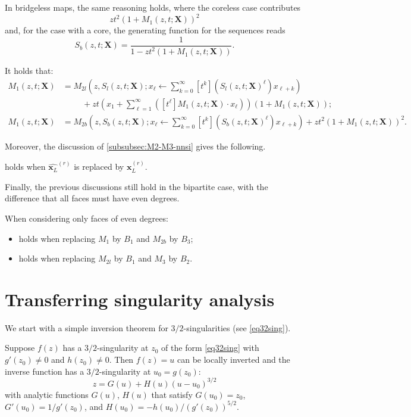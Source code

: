 \documentclass[a4paper,UKenglish,cleveref, autoref, thm-restate]{lipics-v2021}
\renewcommand{\(}{\left(}
\renewcommand{\)}{\right)}
\newcommand{\withroot}{^{(r)}}
\newcommand{\subfamily}{_L}
\newcommand{\xface}{x_{\ell}}
\newcommand{\x}{\mathbf{x}\subfamily}
\newcommand{\xr}{\x\withroot}
\newcommand{\X}{\mathbf{X}}
\newcommand{\xallgons}{\widehat{\x}}
\newcommand{\xallgonsr}{\xallgons\withroot}
\begin{document}
In bridgeless maps, the same reasoning holds, where the coreless case contributes
\[z t^2 \(1+M_1(z,t;\X)\)^2\]
and, for the case with a core, the generating function for the sequences reads
\[S_b(z,t;\X) = \frac{1}{1-zt^2 \(1+M_1(z,t;\X)\)}.\]

\begin{proposition}
\label{prop:M1-M3-faces}
It holds that:
\begin{align*}
M_1(z,t;\X) &= M_{2l}\(z, S_l(z,t;\X); \xface \leftarrow \sum_{k=0}^{\infty} [t^k] (S_l(z,t;\X)^\ell ) x_{\ell+k}\)\\
&\hspace{1cm}+ zt\(x_1 + \sum_{\ell=1}^\infty\([t^\ell] M_1\(z,t;\X\) \cdot \xface\)\) (1 + M_1(z,t;\X));\\
M_1(z,t;\X) &= M_{2b}\(z, S_b(z,t;\X); \xface \leftarrow \sum_{k=0}^{\infty} [t^k] (S_b(z,t;\X)^\ell ) x_{\ell+k}\) + z t^2 \(1+M_1(z,t;\X)\)^2.
\end{align*}
\end{proposition}

Moreover, the discussion of \cref{subsubsec:M2-M3-nnsi} gives the following.
\begin{proposition}
\label{prop:M2-M3-M4-M5-faces}
 holds when $\xallgonsr$ is replaced by $\xr$.
\end{proposition}

Finally, the previous discussions still hold in the bipartite case, with the difference that all faces must have even degrees.
\begin{proposition}
When considering only faces of even degrees:
\begin{itemize}
    \item {} holds when replacing $M_1$ by $B_1$ and $M_{2b}$ by $B_3$;
    \item {} holds when replacing $M_{2l}$ by $B_1$ and $M_3$ by $B_2$.
\end{itemize}
\end{proposition}


\section{Transferring singularity analysis}
\label{sec:transfer-sg-analysis}
We start with a simple inversion theorem for $3/2$-singularities (see \cref{eq32sing}).
\begin{lemma}\label{LeSing1}
    Suppose $f(z)$ has a $3/2$-singularity at $z_0$ of the form 
    \cref{eq32sing} with $g'(z_0)\ne 0$ and $h(z_0) \ne 0$.
    Then $f(z)=u$ can be locally
    inverted and the inverse function has 
    a $3/2$-singularity at $u_0 = g(z_0)$:
    \begin{equation}\label{eqLeSing1}
    z = G(u) + H(u) (u-u_0)^{3/2}
    \end{equation}
    with analytic functions $G(u)$, $H(u)$ that satisfy
    $G(u_0) = z_0$, $G'(u_0) = 1/g'(z_0)$, and 
    $H(u_0) = - h(u_0)/(g'(z_0))^{5/2}$.
\end{lemma}
\end{document}
